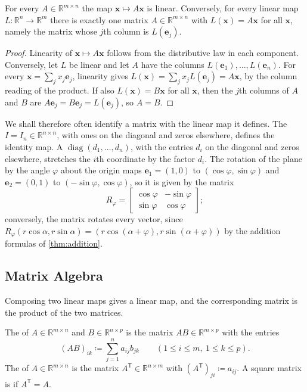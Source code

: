 \begin{proposition}
\label{prop:linear-matrix}
For every $A\in\mathbb R^{m\times n}$ the map $\mathbf x\mapsto A\mathbf x$ is linear. Conversely, for every linear map $L\colon\mathbb R^n\to\mathbb R^m$ there is exactly one matrix $A\in\mathbb R^{m\times n}$ with $L(\mathbf x)=A\mathbf x$ for all $\mathbf x$, namely the matrix whose $j$th column is $L(\mathbf e_j)$.
\end{proposition}

\begin{proof}
Linearity of $\mathbf x\mapsto A\mathbf x$ follows from the distributive law in each component. Conversely, let $L$ be linear and let $A$ have the columns $L(\mathbf e_1),\ldots,L(\mathbf e_n)$. For every $\mathbf x=\sum_jx_j\mathbf e_j$, linearity gives $L(\mathbf x)=\sum_jx_jL(\mathbf e_j)=A\mathbf x$, by the column reading of the product. If also $L(\mathbf x)=B\mathbf x$ for all $\mathbf x$, then the $j$th columns of $A$ and $B$ are $A\mathbf e_j=B\mathbf e_j=L(\mathbf e_j)$, so $A=B$.
\end{proof}

We shall therefore often identify a matrix with the linear map it defines. The  $I=I_n\in\mathbb R^{n\times n}$, with ones on the diagonal and zeros elsewhere, defines the identity map. A  $\operatorname{diag}(d_1,\ldots,d_n)$, with the entries $d_i$ on the diagonal and zeros elsewhere, stretches the $i$th coordinate by the factor $d_i$. The rotation of the plane by the angle $\varphi$ about the origin maps $\mathbf e_1=(1,0)$ to $(\cos\varphi,\sin\varphi)$ and $\mathbf e_2=(0,1)$ to $(-\sin\varphi,\cos\varphi)$, so it is given by the matrix
\[
R_\varphi=\begin{bmatrix}\cos\varphi&-\sin\varphi\\\sin\varphi&\cos\varphi\end{bmatrix};
\]
conversely, the matrix rotates every vector, since $R_\varphi(r\cos\alpha,r\sin\alpha)=(r\cos(\alpha+\varphi),r\sin(\alpha+\varphi))$ by the addition formulas of \cref{thm:addition}.

\subsection{Matrix Algebra}
\label{subsec:matrix-algebra}

Composing two linear maps gives a linear map, and the corresponding matrix is the product of the two matrices.

\begin{definition}
\label{def:matrix-product}
The  of $A\in\mathbb R^{m\times n}$ and $B\in\mathbb R^{n\times p}$ is the matrix $AB\in\mathbb R^{m\times p}$ with the entries
\[
(AB)_{ik}\coloneqq\sum_{j=1}^na_{ij}b_{jk}\qquad(1\le i\le m,\ 1\le k\le p).
\]
The  of $A\in\mathbb R^{m\times n}$ is the matrix $A^{\mathsf T}\in\mathbb R^{n\times m}$ with $(A^{\mathsf T})_{ji}\coloneqq a_{ij}$. A square matrix is  if $A^{\mathsf T}=A$.
\end{definition}

